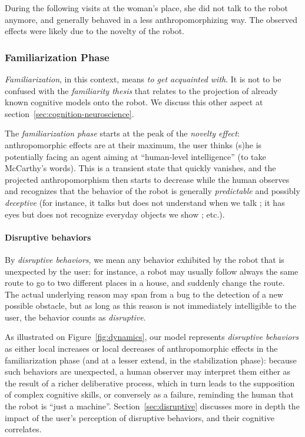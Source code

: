 \documentclass{frontiersSCNS} %
\begin{document}
During the following visits at the woman's place, she did not talk to the robot
anymore, and generally behaved in a less anthropomorphizing way. The observed
effects were likely due to the novelty of the robot.

\subsubsection{Familiarization Phase}
\label{sec:familiarization}

\emph{Familiarization}, in this context, means \emph{to get acquainted with}.
It is not to be confused with the \emph{familiarity thesis} that relates to the
projection of already known cognitive models onto the robot. We discuss this other
aspect at section~\ref{sec:cognition-neuroscience}.

The \emph{familiarization phase} starts at the peak of the \emph{novelty
effect}: anthropomorphic effects are at their maximum, the user thinks (s)he is
potentially facing an agent aiming at ``human-level intelligence'' (to take
McCarthy's words). This is a transient state that quickly vanishes, and the
projected anthropomorphism then starts to decrease while the human observes and
recognizes that the behavior of the robot is generally \emph{predictable} and
possibly \emph{deceptive} (for instance, it talks but does not understand when
we talk ; it has eyes but does not recognize everyday objects we show ; etc.).

\paragraph{Disruptive behaviors}

By \emph{disruptive behaviors}, we mean any behavior exhibited by the robot that
is unexpected by the user: for instance, a robot may usually follow always the
same route to go to two different places in a house, and suddenly change the
route. The actual underlying reason may span from a bug to the detection of a
new possible obstacle, but as long as this reason is not immediately
intelligible to the user, the behavior counts as \emph{disruptive}.

As illustrated on Figure~\ref{fig:dynamics}, our model represents
\emph{disruptive behaviors} as either local increases or local decreases of
anthropomorphic effects in the familiarization phase (and at a lesser extend, in
the stabilization phase): because such behaviors are unexpected, a human
observer may interpret them either as the result of a richer deliberative
process, which in turn leads to the supposition of complex cognitive skills, or
conversely as a failure, reminding the human that the robot is ``just a
machine''. Section~\ref{sec:disruptive} discusses more in depth the impact of
the user's perception of disruptive behaviors, and their cognitive correlates.
\end{document}

